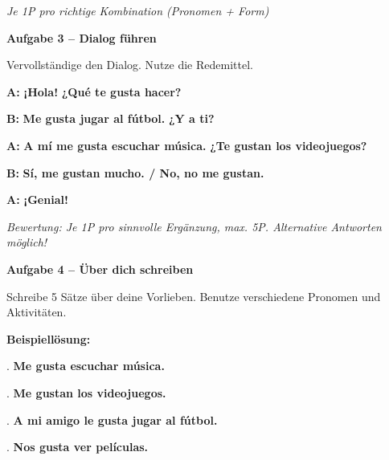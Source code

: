 \documentclass[11pt, a4paper]{article}
\newcommand{\fachfarbe}{spanisch}
\newcommand{\punktebox}[1]{\hfill\fbox{\small \_/#1}}
\newcommand{\loesung}[1]{\textcolor{loesung}{\textbf{#1}}}
\newcommand{\es}[1]{\textcolor{\fachfarbe}{\textbf{#1}}}
\newenvironment{aufgabe}[1]{%
    \vspace{10pt}
    \noindent\textbf{\textcolor{\fachfarbe}{Aufgabe #1}}
    \vspace{5pt}
    \begin{list}{}{\leftmargin=0pt}
    \item[]
}{%
    \end{list}
}
\begin{document}
\textit{\textcolor{grau}{Je 1P pro richtige Kombination (Pronomen + Form)}}

\vspace{15pt}


\begin{aufgabe}{3 -- Dialog führen}
Vervollständige den Dialog. Nutze die Redemittel. \punktebox{5}
\end{aufgabe}

\noindent
\textbf{A:} \es{¡Hola!} \loesung{¿Qué te gusta hacer?}

\textbf{B:} \loesung{Me gusta jugar al fútbol.} \es{¿Y a ti?}

\textbf{A:} \es{A mí me gusta escuchar música.} \loesung{¿Te gustan los videojuegos?}

\textbf{B:} \loesung{Sí, me gustan mucho. / No, no me gustan.}

\textbf{A:} \es{¡Genial!}

\vspace{0.5em}
\textit{\textcolor{grau}{Bewertung: Je 1P pro sinnvolle Ergänzung, max. 5P. Alternative Antworten möglich!}}

\vspace{15pt}


\begin{aufgabe}{4 -- Über dich schreiben}
Schreibe 5 Sätze über deine Vorlieben. Benutze verschiedene Pronomen und Aktivitäten. \punktebox{6}
\end{aufgabe}

\textbf{Beispiellösung:}

\vspace{0.5em}
. \loesung{Me gusta escuchar música.}

\vspace{0.5em}
. \loesung{Me gustan los videojuegos.}

\vspace{0.5em}
. \loesung{A mi amigo le gusta jugar al fútbol.}

\vspace{0.5em}
. \loesung{Nos gusta ver películas.}
\end{document}
